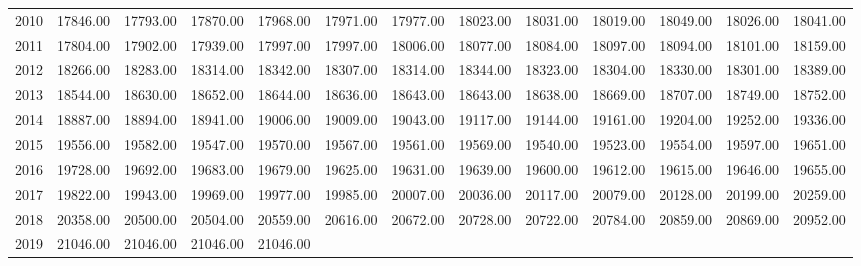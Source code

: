 \begin{longtable}{rrrrrrrrrrrrr}
  2010 & 17846.00 & 17793.00 & 17870.00 & 17968.00 & 17971.00 & 17977.00 & 18023.00 & 18031.00 & 18019.00 & 18049.00 & 18026.00 & 18041.00 \\ 
  2011 & 17804.00 & 17902.00 & 17939.00 & 17997.00 & 17997.00 & 18006.00 & 18077.00 & 18084.00 & 18097.00 & 18094.00 & 18101.00 & 18159.00 \\ 
  2012 & 18266.00 & 18283.00 & 18314.00 & 18342.00 & 18307.00 & 18314.00 & 18344.00 & 18323.00 & 18304.00 & 18330.00 & 18301.00 & 18389.00 \\ 
  2013 & 18544.00 & 18630.00 & 18652.00 & 18644.00 & 18636.00 & 18643.00 & 18643.00 & 18638.00 & 18669.00 & 18707.00 & 18749.00 & 18752.00 \\ 
  2014 & 18887.00 & 18894.00 & 18941.00 & 19006.00 & 19009.00 & 19043.00 & 19117.00 & 19144.00 & 19161.00 & 19204.00 & 19252.00 & 19336.00 \\ 
  2015 & 19556.00 & 19582.00 & 19547.00 & 19570.00 & 19567.00 & 19561.00 & 19569.00 & 19540.00 & 19523.00 & 19554.00 & 19597.00 & 19651.00 \\ 
  2016 & 19728.00 & 19692.00 & 19683.00 & 19679.00 & 19625.00 & 19631.00 & 19639.00 & 19600.00 & 19612.00 & 19615.00 & 19646.00 & 19655.00 \\ 
  2017 & 19822.00 & 19943.00 & 19969.00 & 19977.00 & 19985.00 & 20007.00 & 20036.00 & 20117.00 & 20079.00 & 20128.00 & 20199.00 & 20259.00 \\ 
  2018 & 20358.00 & 20500.00 & 20504.00 & 20559.00 & 20616.00 & 20672.00 & 20728.00 & 20722.00 & 20784.00 & 20859.00 & 20869.00 & 20952.00 \\ 
  2019 & 21046.00 & 21046.00 & 21046.00 & 21046.00 &  &  &  &  &  &  &  &  \\ 
   \hline
\hline
\end{longtable}
